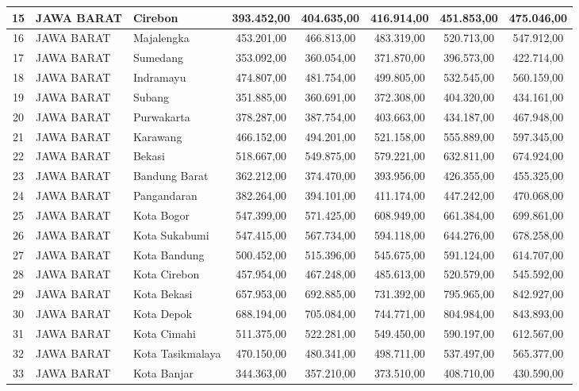 \begin{spacing}{1.0}
\begin{longtable}{|c|p{2.2cm}|p{2.8cm}|c|c|c|c|c|}
15 & JAWA BARAT & Cirebon & 393.452,00 & 404.635,00 & 416.914,00 & 451.853,00 & 475.046,00 \\ \hline
16 & JAWA BARAT & Majalengka & 453.201,00 & 466.813,00 & 483.319,00 & 520.713,00 & 547.912,00 \\ \hline
17 & JAWA BARAT & Sumedang & 353.092,00 & 360.054,00 & 371.870,00 & 396.573,00 & 422.714,00 \\ \hline
18 & JAWA BARAT & Indramayu & 474.807,00 & 481.754,00 & 499.805,00 & 532.545,00 & 560.159,00 \\ \hline
19 & JAWA BARAT & Subang & 351.885,00 & 360.691,00 & 372.308,00 & 404.320,00 & 434.161,00 \\ \hline
20 & JAWA BARAT & Purwakarta & 378.287,00 & 387.754,00 & 403.663,00 & 434.187,00 & 467.948,00 \\ \hline
21 & JAWA BARAT & Karawang & 466.152,00 & 494.201,00 & 521.158,00 & 555.889,00 & 597.345,00 \\ \hline
22 & JAWA BARAT & Bekasi & 518.667,00 & 549.875,00 & 579.221,00 & 632.811,00 & 674.924,00 \\ \hline
23 & JAWA BARAT & Bandung Barat & 362.212,00 & 374.470,00 & 393.956,00 & 426.355,00 & 455.325,00 \\ \hline
24 & JAWA BARAT & Pangandaran & 382.264,00 & 394.101,00 & 411.174,00 & 447.242,00 & 470.068,00 \\ \hline
25 & JAWA BARAT & Kota Bogor & 547.399,00 & 571.425,00 & 608.949,00 & 661.384,00 & 699.861,00 \\ \hline
26 & JAWA BARAT & Kota Sukabumi & 547.415,00 & 567.734,00 & 594.118,00 & 644.276,00 & 678.258,00 \\ \hline
27 & JAWA BARAT & Kota Bandung & 500.452,00 & 515.396,00 & 545.675,00 & 591.124,00 & 614.707,00 \\ \hline
28 & JAWA BARAT & Kota Cirebon & 457.954,00 & 467.248,00 & 485.613,00 & 520.579,00 & 545.592,00 \\ \hline
29 & JAWA BARAT & Kota Bekasi & 657.953,00 & 692.885,00 & 731.392,00 & 795.965,00 & 842.927,00 \\ \hline
30 & JAWA BARAT & Kota Depok & 688.194,00 & 705.084,00 & 744.771,00 & 804.984,00 & 843.893,00 \\ \hline
31 & JAWA BARAT & Kota Cimahi & 511.375,00 & 522.281,00 & 549.450,00 & 590.197,00 & 612.567,00 \\ \hline
32 & JAWA BARAT & Kota Tasikmalaya & 470.150,00 & 480.341,00 & 498.711,00 & 537.497,00 & 565.377,00 \\ \hline
33 & JAWA BARAT & Kota Banjar & 344.363,00 & 357.210,00 & 373.510,00 & 408.710,00 & 430.590,00 \\ \hline

\end{longtable}
\end{spacing}
